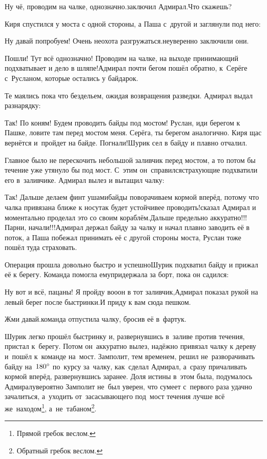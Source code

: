 \diagdash Ну чё, проводим на чалке, однозначно.\mdash заключил Адмирал.\mdash Что скажешь?

Киря спустился у моста с одной стороны, а Паша с~другой и заглянули под него:

\diagdash Ну давай попробуем! Очень неохота разгружаться.\mdash неуверенно заключили они.

\diagdash Пошли! Тут всё однозначно! Проводим на чалке, на выходе принимающий подхватывает и дело в шляпе!\mdash Адмирал почти бегом пошёл обратно, к~Серёге с~Русланом, которые остались у байдарок.

Те маялись пока что бездельем, ожидая возвращения разведки. Адмирал выдал разнарядку:

\diagdash Так! По коням! Будем проводить байды под мостом! Руслан, иди берегом к Пашке, ловите там перед мостом меня. Серёга, ты берегом аналогично. Киря щас вернётся и~пройдет на байде. Погнали!\mdash Шурик сел в байду и плавно отчалил. 

Главное было не перескочить небольшой заливчик перед мостом, а то потом бы течение уже утянуло бы под мост. С~этим он~справился\mdash страхующие подхватили его в~заливчике. Адмирал вылез и вытащил чалку:

\diagdash Так! Дальше делаем финт ушами\mdash байды поворачиваем кормой вперёд, потому что чалка привязана ближе к носу\mdash так будет устойчивее проводить!\mdash сказал Адмирал и моментально проделал это со своим кораблём.\mdash Дальше предельно аккуратно!!! Парни, начали!!!\mdash Адмирал держал байду за чалку и начал плавно заводить её в поток, а Паша побежал принимать её с другой стороны моста, Руслан тоже пошёл туда страховать.

Операция прошла довольно быстро и успешно\mdash Шурик подхватил байду и прижал её к берегу. Команда помогла ему\mdash придержала за борт, пока он садился:

\diagdash Ну вот и всё, пацаны! Я пройду во\sdash о\sdash он в тот заливчик,\mdash Адмирал показал рукой на левый берег после быстринки.\mdash И приду к вам сюда пешком.

\diagdash Жми давай.\mdash команда отпустила чалку, бросив её в~фартук.

\setcounter{footnote}{0}

Шурик легко прошёл быстринку и, развернувшись в~заливе против течения, пристал к~берегу. Потом он~аккуратно вылез, надёжно привязал чалку к дереву и~пошёл к~команде на~мост. Замполит, тем временем, решил не~разворачивать байду на~$180\degree$ по~курсу за~чалку, как~сделал Адмирал, а~сразу причаливать кормой вперёд, развернувшись заранее. Доля истины в~этом была, подумалось Адмиралу\mdash вероятно Замполит не~был уверен, что сумеет с~первого раза удачно зачалиться, а~уходить от~засасывающего под~мост течения лучше всё же~находом\footnote{Прямой гребок веслом.}, а~не~табаном\footnote{Обратный гребок веслом.}. 

